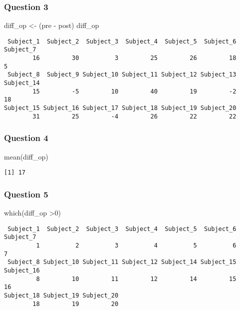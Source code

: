 \documentclass[
  letterpaper,
  DIV=11,
  numbers=noendperiod]{scrartcl}
\newenvironment{Shaded}{\begin{snugshade}}{\end{snugshade}}
\newcommand{\DecValTok}[1]{\textcolor[rgb]{0.68,0.00,0.00}{#1}}
\newcommand{\FunctionTok}[1]{\textcolor[rgb]{0.28,0.35,0.67}{#1}}
\newcommand{\NormalTok}[1]{\textcolor[rgb]{0.00,0.23,0.31}{#1}}
\newcommand{\OtherTok}[1]{\textcolor[rgb]{0.00,0.23,0.31}{#1}}
\newcommand{\SpecialCharTok}[1]{\textcolor[rgb]{0.37,0.37,0.37}{#1}}
\begin{document}
\subsubsection{Question 3}\label{question-3}

\begin{Shaded}
\begin{Highlighting}[]
\NormalTok{diff\_op }\OtherTok{\textless{}{-}}\NormalTok{ (pre }\SpecialCharTok{{-}}\NormalTok{ post)}
\NormalTok{diff\_op}
\end{Highlighting}
\end{Shaded}

\begin{verbatim}
 Subject_1  Subject_2  Subject_3  Subject_4  Subject_5  Subject_6  Subject_7 
        16         30          3         25         26         18          5 
 Subject_8  Subject_9 Subject_10 Subject_11 Subject_12 Subject_13 Subject_14 
        15         -5         10         40         19         -2         18 
Subject_15 Subject_16 Subject_17 Subject_18 Subject_19 Subject_20 
        31         25         -4         26         22         22 
\end{verbatim}

\subsubsection{Question 4}\label{question-4}

\begin{Shaded}
\begin{Highlighting}[]
\FunctionTok{mean}\NormalTok{(diff\_op)}
\end{Highlighting}
\end{Shaded}

\begin{verbatim}
[1] 17
\end{verbatim}

\subsubsection{Question 5}\label{question-5}

\begin{Shaded}
\begin{Highlighting}[]
\FunctionTok{which}\NormalTok{(diff\_op }\SpecialCharTok{\textgreater{}}\DecValTok{0}\NormalTok{)}
\end{Highlighting}
\end{Shaded}

\begin{verbatim}
 Subject_1  Subject_2  Subject_3  Subject_4  Subject_5  Subject_6  Subject_7 
         1          2          3          4          5          6          7 
 Subject_8 Subject_10 Subject_11 Subject_12 Subject_14 Subject_15 Subject_16 
         8         10         11         12         14         15         16 
Subject_18 Subject_19 Subject_20 
        18         19         20 
\end{verbatim}
\end{document}
